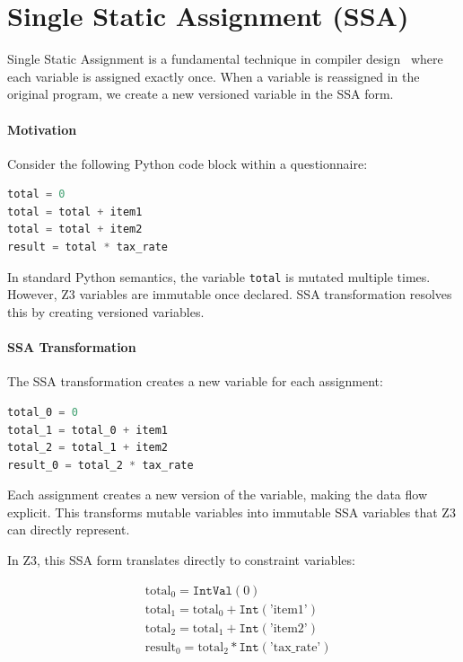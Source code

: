 \section{Single Static Assignment (SSA)}

Single Static Assignment is a fundamental technique in compiler design~\cite{cytron1991efficiently, appel2002modern} where each variable is assigned exactly once. When a variable is reassigned in the original program, we create a new versioned variable in the SSA form.

\paragraph{Motivation}

Consider the following Python code block within a questionnaire:

\begin{lstlisting}[language=Python, numbers=none, caption={Python code with variable reassignment}]
total = 0
total = total + item1
total = total + item2
result = total * tax_rate
\end{lstlisting}

In standard Python semantics, the variable \texttt{total} is mutated multiple times. However, Z3 variables are immutable once declared. SSA transformation resolves this by creating versioned variables.

\paragraph{SSA Transformation}

The SSA transformation creates a new variable for each assignment:

\begin{lstlisting}[language=Python, numbers=none, caption={SSA representation}]
total_0 = 0
total_1 = total_0 + item1
total_2 = total_1 + item2
result_0 = total_2 * tax_rate
\end{lstlisting}

Each assignment creates a new version of the variable, making the data flow explicit. This transforms mutable variables into immutable SSA variables that Z3 can directly represent.

In Z3, this SSA form translates directly to constraint variables:

\begin{align*}
& \text{total}_0 = \texttt{IntVal}(0) \\
& \text{total}_1 = \text{total}_0 + \texttt{Int}(\text{'item1'}) \\
& \text{total}_2 = \text{total}_1 + \texttt{Int}(\text{'item2'}) \\
& \text{result}_0 = \text{total}_2 * \texttt{Int}(\text{'tax\_rate'})
\end{align*}

